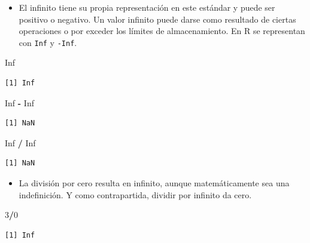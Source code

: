 \documentclass[]{book}
\newenvironment{Shaded}{\begin{snugshade}}{\end{snugshade}}
\newcommand{\DecValTok}[1]{\textcolor[rgb]{0.00,0.00,0.81}{#1}}
\newcommand{\OperatorTok}[1]{\textcolor[rgb]{0.81,0.36,0.00}{\textbf{#1}}}
\newcommand{\OtherTok}[1]{\textcolor[rgb]{0.56,0.35,0.01}{#1}}
\newcommand{\StringTok}[1]{\textcolor[rgb]{0.31,0.60,0.02}{#1}}
\providecommand{\tightlist}{%
  \setlength{\itemsep}{0pt}\setlength{\parskip}{0pt}}
\begin{document}
\begin{itemize}
\tightlist
\item
  El infinito tiene su propia representación en este estándar y puede ser positivo o negativo. Un valor infinito puede darse como resultado de ciertas operaciones o por exceder los límites de almacenamiento. En R se representan con \texttt{Inf} y \texttt{-Inf}.
\end{itemize}

\begin{Shaded}
\begin{Highlighting}[]
\OtherTok{Inf}
\end{Highlighting}
\end{Shaded}

\begin{verbatim}
[1] Inf
\end{verbatim}

\begin{Shaded}
\begin{Highlighting}[]
\OtherTok{Inf} \OperatorTok{-}\StringTok{ }\OtherTok{Inf}
\end{Highlighting}
\end{Shaded}

\begin{verbatim}
[1] NaN
\end{verbatim}

\begin{Shaded}
\begin{Highlighting}[]
\OtherTok{Inf} \OperatorTok{/}\StringTok{ }\OtherTok{Inf}
\end{Highlighting}
\end{Shaded}

\begin{verbatim}
[1] NaN
\end{verbatim}

\begin{itemize}
\tightlist
\item
  La división por cero resulta en infinito, aunque matemáticamente sea una indefinición. Y como contrapartida, dividir por infinito da cero.
\end{itemize}

\begin{Shaded}
\begin{Highlighting}[]
\DecValTok{3}\OperatorTok{/}\DecValTok{0}
\end{Highlighting}
\end{Shaded}

\begin{verbatim}
[1] Inf
\end{verbatim}
\end{document}
